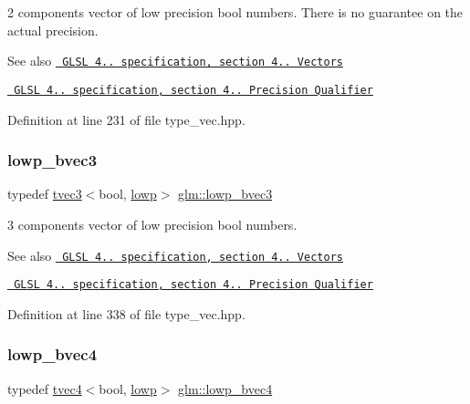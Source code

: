 2 components vector of low precision bool numbers. There is no guarantee on the actual precision.

\begin{DoxySeeAlso}{See also}
\href{http://www.opengl.org/registry/doc/GLSLangSpec.4.20.8.pdf}{\texttt{ G\+L\+SL 4.. specification, section 4.. Vectors}} 

\href{http://www.opengl.org/registry/doc/GLSLangSpec.4.20.8.pdf}{\texttt{ G\+L\+SL 4.. specification, section 4.. Precision Qualifier}} 
\end{DoxySeeAlso}


Definition at line 231 of file type\+\_\+vec.\+hpp.

\mbox{\label{group__core__precision_ga9ebdb78c611619993b9d5b182010529d}} 
\subsubsection{\texorpdfstring{lowp\_bvec3}{lowp\_bvec3}}
{\footnotesize\ttfamily typedef \mbox{\hyperlink{structglm_1_1tvec3}{tvec3}}$<$bool, \mbox{\hyperlink{namespaceglm_a0f04f086094c747d227af4425893f545ae161af3fc695e696ce3bf69f7332bc2d}{lowp}}$>$ \mbox{\hyperlink{group__core__precision_ga9ebdb78c611619993b9d5b182010529d}{glm\+::lowp\+\_\+bvec3}}}

3 components vector of low precision bool numbers.

\begin{DoxySeeAlso}{See also}
\href{http://www.opengl.org/registry/doc/GLSLangSpec.4.20.8.pdf}{\texttt{ G\+L\+SL 4.. specification, section 4.. Vectors}} 

\href{http://www.opengl.org/registry/doc/GLSLangSpec.4.20.8.pdf}{\texttt{ G\+L\+SL 4.. specification, section 4.. Precision Qualifier}} 
\end{DoxySeeAlso}


Definition at line 338 of file type\+\_\+vec.\+hpp.

\mbox{\label{group__core__precision_ga512926597aea7a1afe60ee7b983db86d}} 
\subsubsection{\texorpdfstring{lowp\_bvec4}{lowp\_bvec4}}
{\footnotesize\ttfamily typedef \mbox{\hyperlink{structglm_1_1tvec4}{tvec4}}$<$bool, \mbox{\hyperlink{namespaceglm_a0f04f086094c747d227af4425893f545ae161af3fc695e696ce3bf69f7332bc2d}{lowp}}$>$ \mbox{\hyperlink{group__core__precision_ga512926597aea7a1afe60ee7b983db86d}{glm\+::lowp\+\_\+bvec4}}}

